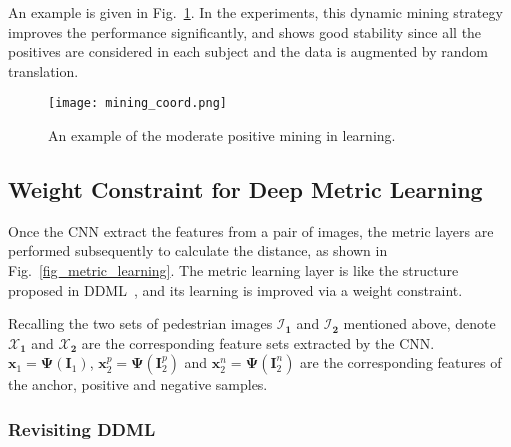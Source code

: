 \documentclass[runningheads]{llncs}
\begin{document}
An example is given in Fig.~\ref{fig_mining_diagram}.
In the experiments, this dynamic mining strategy improves the performance significantly, and shows good stability since all the positives are considered in each subject and the data is augmented by random translation.

\begin{figure}[!htb]
  \centering
  \texttt{[image: mining\_coord.png]}
  \caption{An example of the moderate positive mining in learning.}
  \label{fig_mining_diagram}
\end{figure}






\subsection{Weight Constraint for Deep Metric Learning}
\label{section_Constrained Deep Metric Learning}
Once the CNN extract the features from a pair of images, the metric layers are performed subsequently to calculate the distance, as shown in Fig.~\ref{fig_metric_learning}. The metric learning layer is like the structure proposed in DDML~\cite{hu2014discriminative}, and its learning is improved via a weight constraint.


Recalling the two sets of pedestrian images $\mathcal{I}_\mathbf{1}$ and $\mathcal{I}_\mathbf{2}$ mentioned above, denote $\mathcal{X}_\mathbf{1}$ and $\mathcal{X}_\mathbf{2}$ are the corresponding feature sets extracted by the CNN.
$\mathbf{x}_1 = \mathbf{\Psi}(\mathbf{I}_1)$, $\mathbf{x}_2^p = \mathbf{\Psi}(\mathbf{I}_2^p)$ and $\mathbf{x}_2^n = \mathbf{\Psi}(\mathbf{I}_2^n)$ are the corresponding features of the anchor, positive and negative samples.

\subsubsection{Revisiting DDML}
\end{document}
